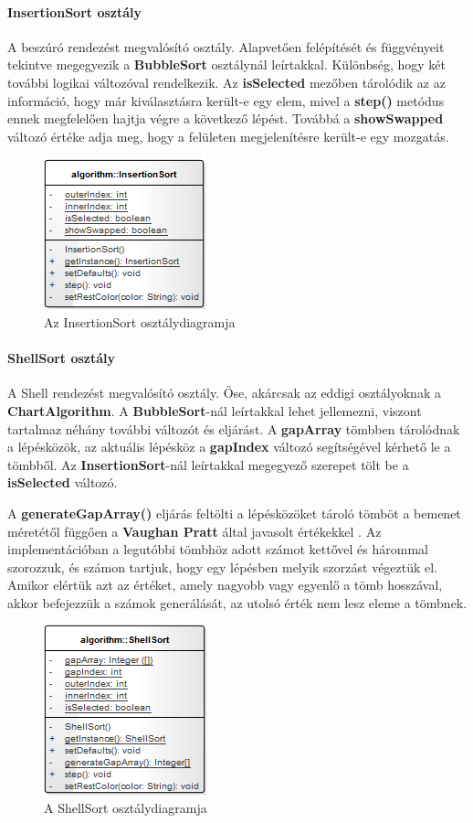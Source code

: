 \documentclass{elteikthesis}
\begin{document}
\paragraph{InsertionSort osztály}
A beszúró rendezést megvalósító osztály. Alapvetően felépítését és függvényeit tekintve megegyezik a \textbf{BubbleSort} osztálynál leírtakkal. Különbség, hogy két további logikai változóval rendelkezik. Az \textbf{isSelected} mezőben tárolódik az az információ, hogy már kiválasztásra került-e egy elem, mivel a \textbf{step()} metódus ennek megfelelően hajtja végre a következő lépést. Továbbá a \textbf{showSwapped} változó értéke adja meg, hogy a felületen megjelenítésre került-e egy mozgatás.
\begin{figure}[H]
	\centering
	\includegraphics{pics/class/InsertionSort.png}
	\caption{Az InsertionSort osztálydiagramja}
\end{figure}
\paragraph{ShellSort osztály}
A Shell rendezést megvalósító osztály. Őse, akárcsak az eddigi osztályoknak a \textbf{ChartAlgorithm}. A \textbf{BubbleSort}-nál leírtakkal lehet jellemezni, viszont tartalmaz néhány további változót és eljárást. A \textbf{gapArray} tömbben tárolódnak a lépésközök, az aktuális lépésköz a \textbf{gapIndex} változó segítségével kérhető le a tömbből. Az \textbf{InsertionSort}-nál leírtakkal megegyező szerepet tölt be a \textbf{isSelected} változó.\par
A \textbf{generateGapArray()} eljárás feltölti a lépésközöket tároló tömböt a bemenet méretétől függően a \textbf{Vaughan Pratt} által javasolt értékekkel \cite{Pratt}. Az implementációban a legutóbbi tömbhöz adott számot kettővel és hárommal szorozzuk, és számon tartjuk, hogy egy lépésben melyik szorzást végeztük el. Amikor elértük azt az értéket, amely nagyobb vagy egyenlő a tömb hosszával, akkor befejezzük a számok generálását, az utolsó érték nem lesz eleme a tömbnek.
\begin{figure}[H]
	\centering
	\includegraphics{pics/class/ShellSort.png}
	\caption{A ShellSort osztálydiagramja}
\end{figure}
\end{document}
